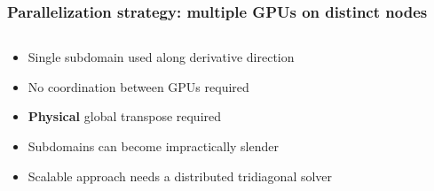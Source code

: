 \begin{frame}
\frametitle{Parallelization strategy: multiple GPUs on distinct nodes}
\begin{columns}
\begin{column}{0.5\textwidth}
\begin{itemize}
\item Single subdomain used along derivative direction
\item No coordination between GPUs required
\item \textbf{Physical} global transpose required
\item Subdomains can become impractically slender
\item Scalable approach needs a distributed tridiagonal solver
\end{itemize}
\end{column}
\begin{column}{0.5\textwidth}
\end{column}
\end{columns}
\end{frame}

